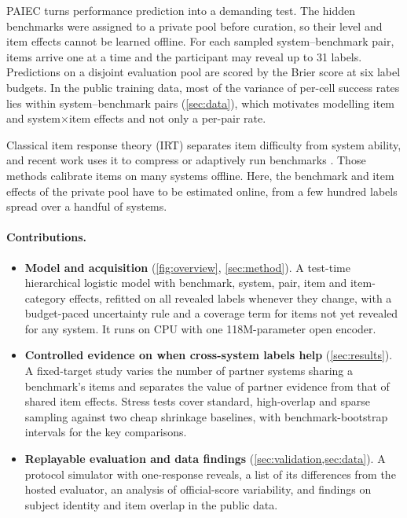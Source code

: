 \documentclass{article}
\begin{document}
PAIEC turns performance prediction \citep{ruan2024observational,pacchiardi2025predictaboard,zhou2025adele,truong2025amortized} into a demanding test. The hidden benchmarks were assigned to a private pool before curation, so their level and item effects cannot be learned offline. For each sampled system--benchmark pair, items arrive one at a time and the participant may reveal up to 31 labels. Predictions on a disjoint evaluation pool are scored by the Brier score \citep{brier1950} at six label budgets.
In the public training data, most of the variance of per-cell success rates lies within system--benchmark pairs (\cref{sec:data}), which motivates modelling item and system$\times$item effects and not only a per-pair rate.

Classical item response theory (IRT) \citep{rasch1960,lord1980} separates item difficulty from system ability, and recent work uses it to compress or adaptively run benchmarks \citep{polo2024tiny,truong2025amortized,hofmann2025fluid}. Those methods calibrate items on many systems offline. Here, the benchmark and item effects of the private pool have to be estimated online, from a few hundred labels spread over a handful of systems.

\paragraph{Contributions.}
\begin{itemize}
  \item \textbf{Model and acquisition} (\cref{fig:overview}, \cref{sec:method}). A test-time hierarchical logistic model with benchmark, system, pair, item and item-category effects, refitted on all revealed labels whenever they change, with a budget-paced uncertainty rule and a coverage term for items not yet revealed for any system. It runs on CPU with one 118M-parameter open encoder.
  \item \textbf{Controlled evidence on when cross-system labels help} (\cref{sec:results}). A fixed-target study varies the number of partner systems sharing a benchmark's items and separates the value of partner evidence from that of shared item effects. Stress tests cover standard, high-overlap and sparse sampling against two cheap shrinkage baselines, with benchmark-bootstrap intervals for the key comparisons.
  \item \textbf{Replayable evaluation and data findings} (\cref{sec:validation,sec:data}). A protocol simulator with one-response reveals, a list of its differences from the hosted evaluator, an analysis of official-score variability, and findings on subject identity and item overlap in the public data.
\end{itemize}
\end{document}
